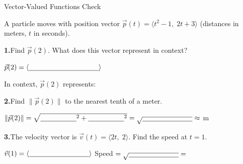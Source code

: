\documentclass[10pt]{article}
\begin{document}
\namedateperiod

\vspace{0.12in}

\begin{notesbox}{Vector-Valued Functions Check}

A particle moves with position vector $\vec{p}(t)=\langle t^{2}-1,\;2t+3\rangle$
(distances in meters, $t$ in seconds).

\vspace{10pt}
\textbf{1.}\quad Find $\vec{p}(2)$.  What does this vector represent in context?

\vspace{8pt}
$\vec{p}(2) = \langle \blank{3.5cm}\rangle$

\vspace{6pt}
In context, $\vec{p}(2)$ represents: \writeline

\vspace{14pt}
\textbf{2.}\quad Find $\|\vec{p}(2)\|$ to the nearest tenth of a meter.

\vspace{8pt}
\hspace{1em} $\|\vec{p}(2)\| = \sqrt{\blank{1.8cm}^{2}+\blank{1.8cm}^{2}}
= \sqrt{\blank{2.5cm}} \approx $ \blank{2cm} m

\vspace{14pt}
\textbf{3.}\quad The velocity vector is $\vec{v}(t)=\langle 2t,\;2\rangle$.
Find the speed at $t=1$.

\vspace{8pt}
\hspace{1em} $\vec{v}(1) = \langle \blank{3cm}\rangle$ \qquad
Speed $= \sqrt{\blank{2.5cm}} = $ \blank{3cm}

\end{notesbox}
\end{document}
